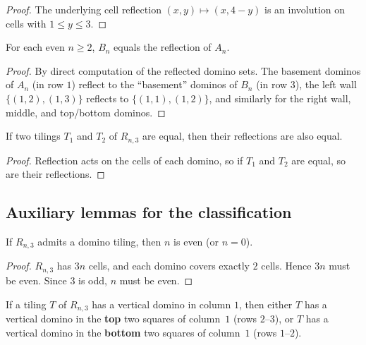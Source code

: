 \begin{proof}
\leanok
The underlying cell reflection $(x, y) \mapsto (x, 4 - y)$ is an involution
on cells with $1 \le y \le 3$.
\end{proof}

\begin{lemma}
\label{lem.details.domino.TilingB-eq-reflect}
\leanhelper
\leanok
For each even $n \ge 2$, $B_n$ equals the reflection of $A_n$.
\end{lemma}

\begin{proof}
\leanok
By direct computation of the reflected domino sets.
The basement dominos of $A_n$ (in row $1$) reflect to the ``basement'' dominos
of $B_n$ (in row $3$), the left wall $\{(1,2),(1,3)\}$ reflects to
$\{(1,1),(1,2)\}$, and similarly for the right wall, middle, and top/bottom dominos.
\end{proof}

\begin{lemma}
\label{lem.details.domino.reflectTiling3-preserves-equiv}
\leanhelper
\leanok
If two tilings $T_1$ and $T_2$ of $R_{n,3}$ are equal,
then their reflections are also equal.
\end{lemma}

\begin{proof}
\leanok
Reflection acts on the cells of each domino, so if $T_1$ and $T_2$ are
equal, so are their reflections.
\end{proof}

\subsection{Auxiliary lemmas for the classification}

\begin{lemma}
\label{lem.details.domino.parity}
\leanhelper
\leanok
If $R_{n,3}$ admits a domino tiling, then $n$ is even (or $n = 0$).
\end{lemma}

\begin{proof}
\leanok
$R_{n,3}$ has $3n$ cells, and each domino covers exactly $2$ cells.
Hence $3n$ must be even. Since $3$ is odd, $n$ must be even.
\end{proof}

\begin{lemma}
\label{lem.details.domino.vertical-trichotomy}
\leanhelper
\leanok
If a tiling $T$ of $R_{n,3}$ has a vertical domino in column $1$,
then either $T$ has a vertical domino in the \textbf{top} two squares
of column~$1$ (rows $2$--$3$), or $T$ has a vertical domino in the
\textbf{bottom} two squares of column~$1$ (rows $1$--$2$).
\end{lemma}

